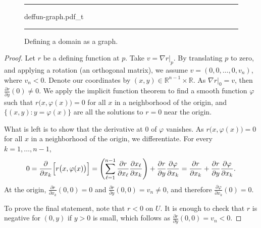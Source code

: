 \documentclass[12pt,openany]{book}
\newcommand{\avoidbreak}{\postdisplaypenalty=100}
\newcommand{\R}{{\mathbb{R}}}
\theoremstyle{plain}
\theoremstyle{remark}
\theoremstyle{definition}
\newenvironment{myfig}{%
\begin{figure}[h!t]
\noindent\rule{\textwidth}{0.5pt}\vspace{12pt}\par\centering}%
{\par\noindent\rule{\textwidth}{0.5pt}
\end{figure}}
\theoremstyle{exercise}
\theoremstyle{example}
\begin{document}
\begin{myfig}
{deffun-graph.pdf_t}
\caption{Defining a domain as a graph.\label{fig:deffun-graph}}
\end{myfig}

\begin{proof}
Let $r$ be a defining function at $p$.  Take $v = \nabla r|_p$.
By translating $p$ to zero, and applying a rotation (an orthogonal matrix),
we assume $v = (0,0,\ldots,0,v_n)$, where $v_n < 0$.  Denote our
coordinates by $(x,y) \in \R^{n-1} \times \R$.  As $\nabla r|_0 =
v$, then $\frac{\partial r}{\partial y}(0) \not= 0$.  We apply
the implicit function theorem to find a
smooth function $\varphi$ such that
$r\bigl(x,\varphi(x)\bigr) = 0$ for all $x$ in a neighborhood of the
origin, and $\bigl\{ (x,y) : y=\varphi(x) \bigr\}$ are all the
solutions to $r = 0$ near the origin.

What is left is to show that the derivative at 0 of $\varphi$ vanishes.
As
$r\bigl(x,\varphi(x)\bigr) = 0$ for all $x$ in a neighborhood of the
origin, we differentiate.
For every $k=1,\ldots,n-1$,
\begin{equation*}
0 =
\frac{\partial}{\partial x_k} \Bigl[
r\bigl(x,\varphi(x)\bigr)
\Bigr]
=
\left(
\sum_{\ell=1}^{n-1}
\frac{\partial r}{\partial x_\ell}
\frac{\partial x_\ell}{\partial x_k}
\right)
+
\frac{\partial r}{\partial y}
\frac{\partial \varphi}{\partial x_k}
=
\frac{\partial r}{\partial x_k}
+
\frac{\partial r}{\partial y}
\frac{\partial \varphi}{\partial x_k} .
\avoidbreak
\end{equation*}
At the origin,
$\frac{\partial r}{\partial x_k}(0,0) = 0$ and
$\frac{\partial r}{\partial y}(0,0) = v_n \not= 0$, and therefore
$\frac{\partial \varphi}{\partial x_k}(0) = 0$.

To prove the final statement, note that
$r < 0$ on $U$.  It is enough to check that $r$ is
negative for $(0,y)$ if $y > 0$ is small, which follows as $\frac{\partial
r}{\partial y}(0,0) = v_n < 0$.
\end{proof}
\end{document}
